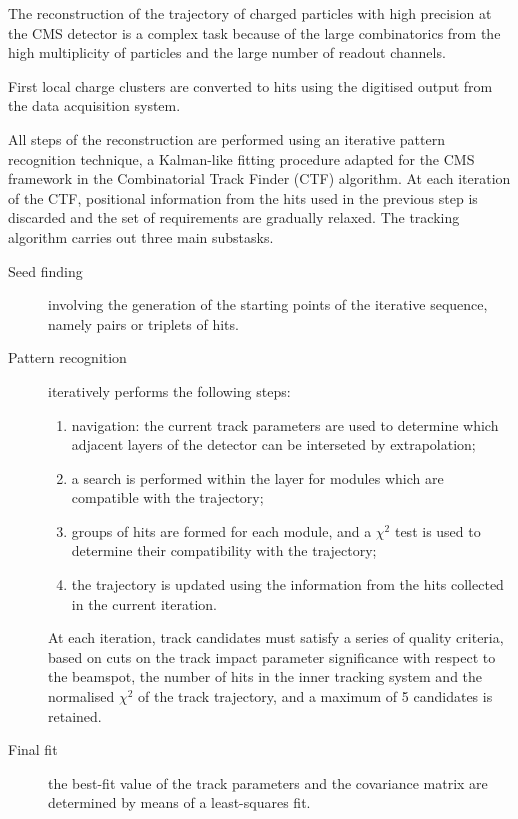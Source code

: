 The reconstruction of the trajectory of charged particles with high precision at the CMS detector
is a complex task because of the large combinatorics from the high multiplicity of particles and the large number of readout channels.

First local charge clusters are converted to hits using the digitised output from the data acquisition system.

All steps of the reconstruction are performed using an iterative pattern recognition technique, a Kalman-like fitting procedure adapted for the CMS framework in the Combinatorial Track Finder \cite{billoir.qian:simultaneous} (CTF) algorithm.
At each iteration of the CTF, positional information from the hits used in the previous step is discarded and the set of requirements are gradually relaxed.
The tracking algorithm carries out three main substasks.
\begin{description}
\item[Seed finding] involving the generation of the starting points of the iterative sequence, namely pairs or triplets of hits.
\item[Pattern recognition] iteratively performs the following steps:
  \begin{enumerate}
  \item navigation: the current track parameters are used to determine which adjacent layers of the detector can be interseted by extrapolation;
  \item a search is performed within the layer for modules which are compatible with the trajectory;
  \item groups of hits are formed for each module, and a $\chi^2$ test is used to determine their compatibility with the trajectory;
  \item the trajectory is updated using the information from the hits collected in the current iteration.
  \end{enumerate}
  At each iteration, track candidates must satisfy a series of quality criteria, based on cuts on the track impact parameter significance with respect to the beamspot, the number of hits in the inner tracking system and the normalised $\chi^2$ of the track trajectory, and a maximum of 5 candidates is retained.
\item[Final fit] the best-fit value of the track parameters and the covariance matrix are determined by means of a least-squares fit.
\end{description}

